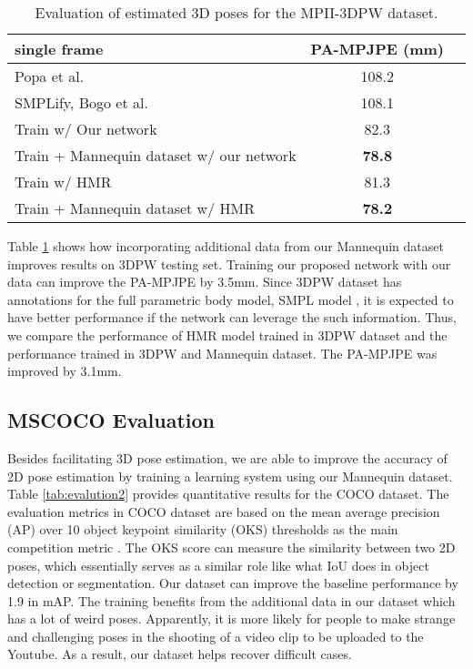 \documentclass{article}
\begin{document}
\begin{table}[h]
\centering
\begin{tabular}{l|cc}\hline\hline
single frame & PA-MPJPE (mm)   \\ \hline
Popa et al. \cite{popa2017deep} & 108.2 \\
SMPLify, Bogo et al. \cite{bogo2016keep} & 108.1 \\
Train w/ Our network & 82.3 \\
Train + Mannequin dataset w/ our network & \textbf{78.8} \\ \hline
Train w/ HMR \cite{kanazawa2018end} & 81.3  \\
Train + Mannequin dataset w/ HMR \cite{kanazawa2018end} & \textbf{78.2} \\ \hline \hline
\end{tabular}
\caption{Evaluation of estimated 3D poses for the MPII-3DPW dataset.}\label{tab:3dpw}
\end{table}


Table \ref{tab:3dpw} shows how incorporating additional data from our
Mannequin dataset improves results on 3DPW testing set.  Training our
proposed network with our data can improve the PA-MPJPE by 3.5mm. Since
3DPW dataset has annotations for the full parametric body model, SMPL
model \cite{loper2015smpl}, it is expected to have better performance if
the network can leverage the such information. Thus, we compare the
performance of HMR model trained in 3DPW dataset and the performance
trained in 3DPW and Mannequin dataset. The PA-MPJPE was improved by 3.1mm.

\subsection{MSCOCO Evaluation}

Besides facilitating 3D pose estimation, we are able to improve the
accuracy of 2D pose estimation by training a learning system using our
Mannequin dataset.  Table \ref{tab:evalution2} provides quantitative
results for the COCO dataset. The evaluation metrics in COCO dataset  are based on the mean average precision (AP) over 10 object keypoint similarity (OKS) thresholds as the main competition metric \cite{lin2014microsoft}. The OKS score can measure the similarity between two 2D poses, which essentially serves as a similar role like what IoU does in object
detection or segmentation. Our dataset can improve the baseline
performance by 1.9 in mAP. The training benefits from the additional data in our dataset which has a lot of weird poses.  Apparently, it is more likely for people to make strange and
challenging poses in the shooting of a video clip to be uploaded to the
Youtube. As a result, our dataset helps recover difficult cases. 
\end{document}
